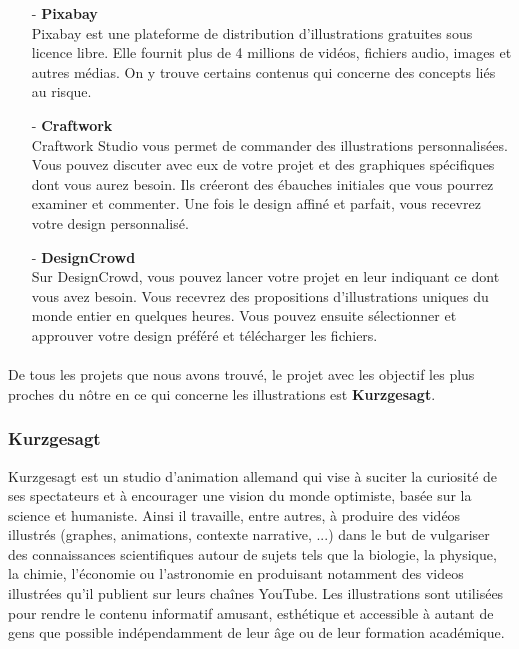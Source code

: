 \begin{itemize}
				\item[-] \textbf{Pixabay}\\
					Pixabay est une plateforme de distribution d'illustrations gratuites sous licence libre. Elle fournit plus de 4 millions de vid\'eos, fichiers audio, images et autres m\'edias. On y trouve certains contenus qui concerne des concepts li\'es au risque.\\

				\item[-] \textbf{Craftwork}\\
					Craftwork Studio vous permet de commander des illustrations personnalis\'ees. Vous pouvez discuter avec eux de votre projet et des graphiques sp\'ecifiques dont vous aurez besoin. Ils cr\'eeront des \'ebauches initiales que vous pourrez examiner et commenter. Une fois le design affin\'e et parfait, vous recevrez votre design personnalis\'e.\\


				\item[-] \textbf{DesignCrowd}\\
					Sur DesignCrowd, vous pouvez lancer votre projet en leur indiquant ce dont vous avez besoin. Vous recevrez des propositions d'illustrations uniques du monde entier en quelques heures. Vous pouvez ensuite s\'electionner et approuver votre design pr\'ef\'er\'e et t\'el\'echarger les fichiers.


			\end{itemize}


		\paragraph{} De tous les projets que nous avons trouv\'e, le projet avec les objectif les plus proches du n\^otre en ce qui concerne les illustrations est \textbf{Kurzgesagt}.

\subsubsection{Kurzgesagt}
	Kurzgesagt est un studio d'animation allemand qui  vise \`a suciter la curiosit\'e de ses spectateurs et \`a encourager une vision du monde optimiste, bas\'ee sur la science et humaniste. Ainsi il travaille, entre autres, \`a produire des vid\'eos illustr\'es (graphes, animations, contexte narrative, ...) dans le but de vulgariser des connaissances scientifiques autour de sujets tels que la biologie, la physique, la chimie, l'\'economie ou l'astronomie en produisant notamment des videos illustr\'ees qu'il publient sur leurs cha\^ines YouTube. Les illustrations sont utilis\'ees pour rendre le contenu informatif amusant, esth\'etique et accessible \`a autant de gens que possible ind\'ependamment de leur \^age ou de leur formation acad\'emique.

